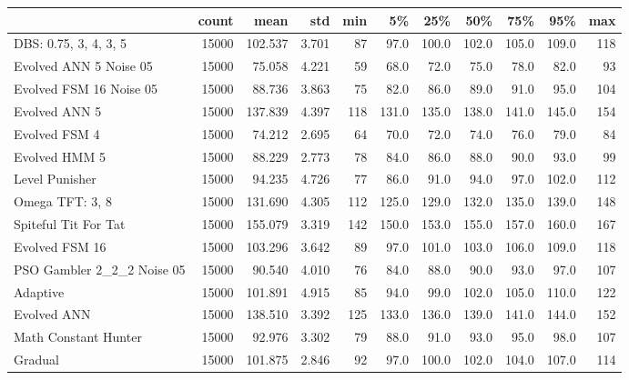 \begin{tabular}{lrrrrrrrrrr}
\toprule
{} &  count &     mean &    std &  min &     5\% &    25\% &    50\% &    75\% &    95\% &  max \\
\midrule
DBS: 0.75, 3, 4, 3, 5      &  15000 &  102.537 &  3.701 &   87 &   97.0 &  100.0 &  102.0 &  105.0 &  109.0 &  118 \\
Evolved ANN 5 Noise 05     &  15000 &   75.058 &  4.221 &   59 &   68.0 &   72.0 &   75.0 &   78.0 &   82.0 &   93 \\
Evolved FSM 16 Noise 05    &  15000 &   88.736 &  3.863 &   75 &   82.0 &   86.0 &   89.0 &   91.0 &   95.0 &  104 \\
Evolved ANN 5              &  15000 &  137.839 &  4.397 &  118 &  131.0 &  135.0 &  138.0 &  141.0 &  145.0 &  154 \\
Evolved FSM 4              &  15000 &   74.212 &  2.695 &   64 &   70.0 &   72.0 &   74.0 &   76.0 &   79.0 &   84 \\
Evolved HMM 5              &  15000 &   88.229 &  2.773 &   78 &   84.0 &   86.0 &   88.0 &   90.0 &   93.0 &   99 \\
Level Punisher             &  15000 &   94.235 &  4.726 &   77 &   86.0 &   91.0 &   94.0 &   97.0 &  102.0 &  112 \\
Omega TFT: 3, 8            &  15000 &  131.690 &  4.305 &  112 &  125.0 &  129.0 &  132.0 &  135.0 &  139.0 &  148 \\
Spiteful Tit For Tat       &  15000 &  155.079 &  3.319 &  142 &  150.0 &  153.0 &  155.0 &  157.0 &  160.0 &  167 \\
Evolved FSM 16             &  15000 &  103.296 &  3.642 &   89 &   97.0 &  101.0 &  103.0 &  106.0 &  109.0 &  118 \\
PSO Gambler 2\_2\_2 Noise 05 &  15000 &   90.540 &  4.010 &   76 &   84.0 &   88.0 &   90.0 &   93.0 &   97.0 &  107 \\
Adaptive                   &  15000 &  101.891 &  4.915 &   85 &   94.0 &   99.0 &  102.0 &  105.0 &  110.0 &  122 \\
Evolved ANN                &  15000 &  138.510 &  3.392 &  125 &  133.0 &  136.0 &  139.0 &  141.0 &  144.0 &  152 \\
Math Constant Hunter       &  15000 &   92.976 &  3.302 &   79 &   88.0 &   91.0 &   93.0 &   95.0 &   98.0 &  107 \\
Gradual                    &  15000 &  101.875 &  2.846 &   92 &   97.0 &  100.0 &  102.0 &  104.0 &  107.0 &  114 \\
\bottomrule
\end{tabular}
